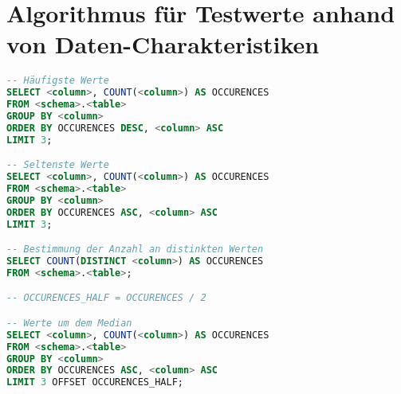\clearpage
\section{Algorithmus für Testwerte anhand von Daten-Charakteristiken}

\begin{lstlisting}[caption={Bestimmung von vorzuschlagenden Testwerten}, label={lst:distinctvalues}, language=SQL]
-- Häufigste Werte
SELECT <column>, COUNT(<column>) AS OCCURENCES
FROM <schema>.<table>
GROUP BY <column>
ORDER BY OCCURENCES DESC, <column> ASC
LIMIT 3;

-- Seltenste Werte
SELECT <column>, COUNT(<column>) AS OCCURENCES
FROM <schema>.<table>
GROUP BY <column>
ORDER BY OCCURENCES ASC, <column> ASC
LIMIT 3;

-- Bestimmung der Anzahl an distinkten Werten
SELECT COUNT(DISTINCT <column>) AS OCCURENCES
FROM <schema>.<table>;

-- OCCURENCES_HALF = OCCURENCES / 2

-- Werte um dem Median
SELECT <column>, COUNT(<column>) AS OCCURENCES
FROM <schema>.<table>
GROUP BY <column>
ORDER BY OCCURENCES ASC, <column> ASC
LIMIT 3 OFFSET OCCURENCES_HALF;
\end{lstlisting}